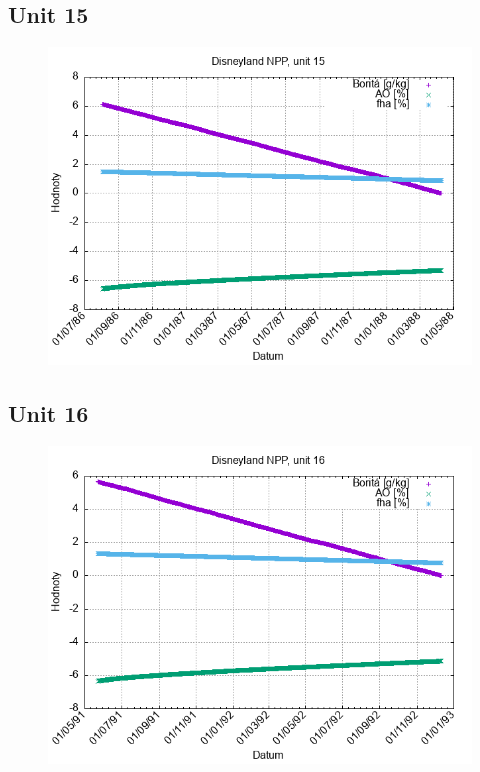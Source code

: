 \documentclass{article}
\begin{document}
\subsection*{Unit 15}
\begin{figure}[h!]
\centering
\includegraphics[width=14cm]{./grafy/Disneyland15.png}
\end{figure}
\clearpage
\subsection*{Unit 16}
\begin{figure}[h!]
\centering
\includegraphics[width=14cm]{./grafy/Disneyland16.png}
\end{figure}
\clearpage
\end{document}
